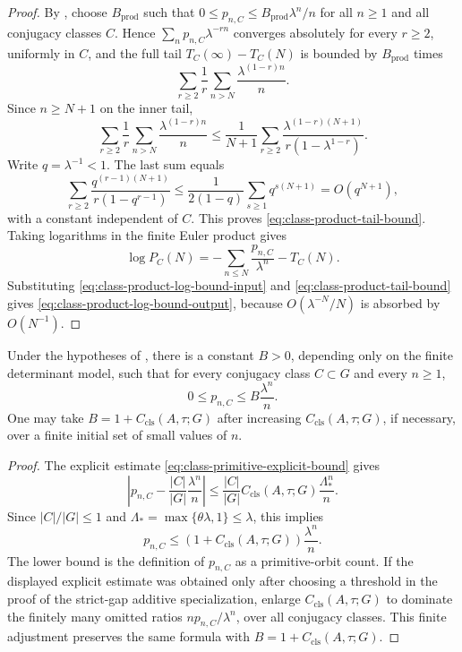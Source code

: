 \begin{proof}
  By , choose
  \(B_{\mathrm{prod}}\) such that
  \(0\le p_{n,C}\le B_{\mathrm{prod}}\lambda^n/n\) for all \(n\ge1\) and all
  conjugacy classes \(C\).  Hence \(\sum_np_{n,C}\lambda^{-rn}\) converges absolutely for
  every \(r\ge2\), uniformly in \(C\), and the full tail
  \(T_C(\infty)-T_C(N)\) is bounded by
  \(B_{\mathrm{prod}}\) times
  \[
    \sum_{r\ge2}\frac1r\sum_{n>N}\frac{\lambda^{(1-r)n}}{n}.
  \]
  Since \(n\ge N+1\) on the inner tail,
  \[
    \sum_{r\ge2}\frac1r\sum_{n>N}\frac{\lambda^{(1-r)n}}{n}
    \le
    \frac{1}{N+1}
    \sum_{r\ge2}\frac{\lambda^{(1-r)(N+1)}}{r(1-\lambda^{1-r})}.
  \]
  Write \(q=\lambda^{-1}<1\).  The last sum equals
  \[
    \sum_{r\ge2}\frac{q^{(r-1)(N+1)}}{r(1-q^{r-1})}
    \le
    \frac{1}{2(1-q)}\sum_{s\ge1}q^{s(N+1)}
    =O(q^{N+1}),
  \]
  with a constant independent of \(C\).  This proves
  \eqref{eq:class-product-tail-bound}.  Taking logarithms in the finite
  Euler product gives
  \[
    \log P_C(N)=
    -\sum_{n\le N}\frac{p_{n,C}}{\lambda^n}-T_C(N).
  \]
  Substituting \eqref{eq:class-product-log-bound-input} and
  \eqref{eq:class-product-tail-bound} gives
  \eqref{eq:class-product-log-bound-output}, because
  \(O(\lambda^{-N}/N)\) is absorbed by \(O(N^{-1})\).
\end{proof}

\begin{lemma}
  \label{lem:global-primitive-class-bound}
  Under the hypotheses of , there is a
  constant \(B>0\), depending only on the finite determinant model, such that
  for every conjugacy class \(C\subset G\) and every \(n\ge1\),
  \begin{equation}\label{eq:global-primitive-class-bound}
    0\le p_{n,C}\le B\frac{\lambda^n}{n}.
  \end{equation}
  One may take \(B=1+C_{\mathrm{cls}}(A,\tau;G)\) after increasing
  \(C_{\mathrm{cls}}(A,\tau;G)\), if necessary, over a finite initial set of
  small values of \(n\).
\end{lemma}

\begin{proof}
  The explicit estimate
  \eqref{eq:class-primitive-explicit-bound} gives
  \[
    \left|p_{n,C}-\frac{|C|}{|G|}\frac{\lambda^n}{n}\right|
    \le
    \frac{|C|}{|G|}C_{\mathrm{cls}}(A,\tau;G)
    \frac{\Lambda_*^n}{n}.
  \]
  Since \(|C|/|G|\le1\) and \(\Lambda_*=\max\{\theta\lambda,1\}\le\lambda\),
  this implies
  \[
    p_{n,C}\le
    \left(1+C_{\mathrm{cls}}(A,\tau;G)\right)\frac{\lambda^n}{n}.
  \]
  The lower bound is the definition of \(p_{n,C}\) as a primitive-orbit count.
  If the displayed explicit estimate was obtained only after choosing a
  threshold in the proof of the strict-gap additive specialization, enlarge
  \(C_{\mathrm{cls}}(A,\tau;G)\) to dominate the finitely many omitted ratios
  \(n p_{n,C}/\lambda^n\), over all conjugacy classes.  This finite adjustment
  preserves the same formula with \(B=1+C_{\mathrm{cls}}(A,\tau;G)\).
\end{proof}

